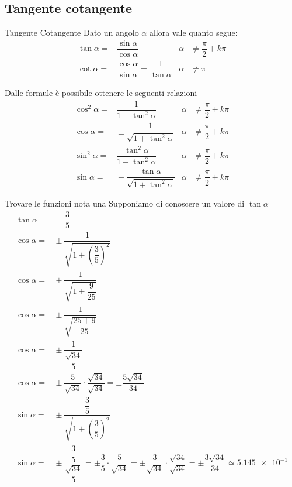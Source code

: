\subsection{Tangente cotangente}
\label{sec:TangenteCotangente}
\begin{definizionet}{Tangente Cotangente}{}
	Dato un angolo $\alpha$ allora vale quanto segue:
\begin{align}
\tan\alpha=&{}\dfrac{\sin\alpha}{\cos\alpha}&\alpha&{}\neq\dfrac{\pi}{2}+k\pi\label{equ:tangente1}\\
\cot\alpha=&{}\dfrac{\cos\alpha}{\sin\alpha}={}\dfrac{1}{\tan\alpha}& \alpha&{}\neq\pi\label{equ:cotangente1}
\end{align}
\end{definizionet}
Dalle formule\nobs{} è possibile ottenere le seguenti relazioni
\begin{align*}
\cos^{2}\alpha=&{}\dfrac{1}{1+{\tan}^{2}\alpha} &\alpha&{}\neq\dfrac{\pi}{2}+k\pi\\
\cos\alpha=&{}\pm\dfrac{1}{\sqrt{1+{\tan}^{2}\alpha}} &\alpha{}&\neq\dfrac{\pi}{2}+k\pi\\
\sin^{2}\alpha=&{}\dfrac{\tan^{2}\alpha}{1+\tan^{2}\alpha}&\alpha{}&\neq\dfrac{\pi}{2}+k\pi\\
\sin\alpha=&{}\pm\dfrac{\tan\alpha}{\sqrt{1+\tan^{2}\alpha}}&\alpha{}&\neq\dfrac{\pi}{2}+k\pi
\end{align*}
\begin{esempiot}{Trovare le funzioni nota una}{}
Supponiamo di conoscere un valore di $\tan\alpha$
\begin{align*}
\tan\alpha&{}=\dfrac{3}{5}\\
\cos\alpha=&{}\pm\dfrac{1}{\sqrt{1+\left(\dfrac{3}{5}\right)^2}}\\
\cos\alpha=&{}\pm\dfrac{1}{\sqrt{1+\dfrac{9}{25}}}\\
\cos\alpha=&{}\pm\dfrac{1}{\sqrt{\dfrac{25+9}{25}}}\\
\cos\alpha=&{}\pm\dfrac{1}{\dfrac{\sqrt{34}}{5}}\\
\cos\alpha=&{}\pm\dfrac{5}{\sqrt{34}}\cdot\dfrac{\sqrt{34}}{\sqrt{34}}=\pm\dfrac{5\sqrt{34}}{34}\\
\sin\alpha=&{}\pm\dfrac{\dfrac{3}{5}}{\sqrt{1+\left(\dfrac{3}{5}\right)^2}}\\
\sin\alpha=&{}\pm\dfrac{\dfrac{3}{5}}{\dfrac{\sqrt{34}}{5}}=\pm\dfrac{3}{5}\cdot\dfrac{5}{\sqrt{34}}=\pm\dfrac{3}{\sqrt{34}}\cdot\dfrac{\sqrt{34}}{\sqrt{34}}=\pm\dfrac{3\sqrt{34}}{34}\simeq\num{5.145e-1}
\end{align*}
\end{esempiot}
